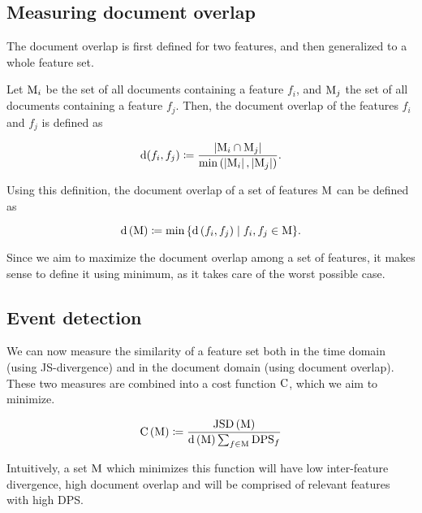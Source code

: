 \subsection{Measuring document overlap}

The document overlap is first defined for two features, and then generalized to a whole feature set.

Let $\text{M}_{i}$ be the set of all documents containing a feature $f_{i}$, and $\text{M}_{j}$ the set of all documents containing a feature $f_{j}$. Then, the document overlap of the features $f_{i}$ and $f_{j}$ is defined as

\begin{equation}
	\text{d}(f_{i}, f_{j}) \coloneqq \frac{\left\vert{\text{M}_{i} \cap \text{M}_{j}}\right\vert}{\min \left( {\left\vert{\text{M}_{i}}\right\vert, \left\vert{\text{M}_{j}}\right\vert} \right)}.
\end{equation}

Using this definition, the document overlap of a set of features $\text{M}$ can be defined as

\begin{equation}
	\text{d} \left( \text{M} \right) \coloneqq \min{\{ \text{d}\left( f_{i}, f_{j} \right) \mid f_{i}, f_{j} \in \text{M}\}}.
\end{equation}

Since we aim to maximize the document overlap among a set of features, it makes sense to define it using minimum, as it takes care of the worst possible case.


\subsection{Event detection}

We can now measure the similarity of a feature set both in the time domain (using JS-divergence) and in the document domain (using document overlap). These two measures are combined into a cost function $\text{C}$, which we aim to minimize.

\begin{equation} \label{eq:cost-function}
	\text{C} \left( \text{M} \right) \coloneqq \frac{\text{JSD} \left( \text{M} \right)}{\text{d} \left( \text{M} \right) \sum_{f \in \text{M}}{\text{DPS}_{f}}}
\end{equation}

Intuitively, a set $\text{M}$ which minimizes this function will have low inter-feature divergence, high document overlap and will be comprised of relevant features with high DPS.

